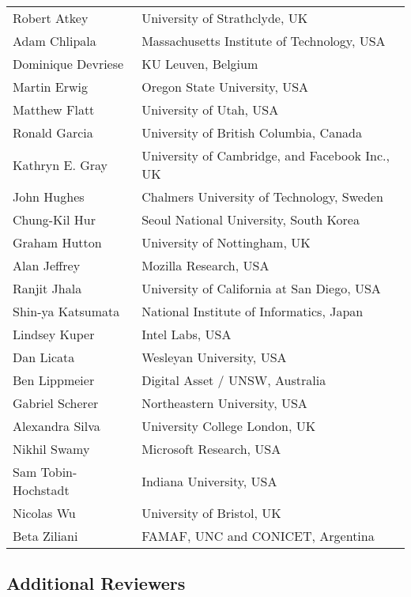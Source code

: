 \begin{tabular}{@{}p{\namewidth}l@{}}
Robert Atkey        & University of Strathclyde, UK\\
Adam Chlipala       & Massachusetts Institute of Technology, USA\\
Dominique Devriese  & KU Leuven, Belgium\\
Martin Erwig        & Oregon State University, USA\\
Matthew Flatt       & University of Utah, USA\\
Ronald Garcia       & University of British Columbia, Canada\\
Kathryn E. Gray     & University of Cambridge, and Facebook Inc., UK\\
John Hughes         & Chalmers University of Technology, Sweden\\
Chung-Kil Hur       & Seoul National University, South Korea\\
Graham Hutton       & University of Nottingham, UK\\
Alan Jeffrey        & Mozilla Research, USA\\
Ranjit Jhala        & University of California at San Diego, USA\\
Shin-ya Katsumata   & National Institute of Informatics, Japan\\
Lindsey Kuper       & Intel Labs, USA\\
Dan Licata          & Wesleyan University, USA\\
Ben Lippmeier       & Digital Asset / UNSW, Australia\\
Gabriel Scherer     & Northeastern University, USA\\
Alexandra Silva     & University College London, UK\\
Nikhil Swamy        & Microsoft Research, USA\\
Sam Tobin-Hochstadt & Indiana University, USA\\
Nicolas Wu          & University of Bristol, UK\\
Beta Ziliani        & FAMAF, UNC and CONICET, Argentina
\end{tabular}

\subsection*{\sffamily Additional Reviewers}

